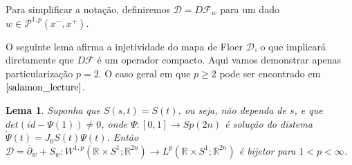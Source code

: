 \documentclass[12pt]{book}
\newtheorem{lema}[teorema]{Lema}
\newcommand{\caminhosexponenciaisconectantes}[2]{\mathcal{P}^{1,p}(#1, #2)}
\newcommand{\caminhosexponenciaisconectantespadrao}{\caminhosexponenciaisconectantes{x^{-}}{x^{+}}}
\newcommand{\circulo}{S^{1}}
\newcommand{\diferencialmapafloer}{D\mapafloer}
\newcommand{\diferencialmapafloerabrev}{\mathcal{D}}
\newcommand{\espacoLpcontradominio}[2]{L^{p}(#1;#2)}
\newcommand{\espacoLpretacirculo}{\espacoLpcontradominio{\retacartesianocirculo}{\real{2n}}}
\newcommand{\espacosobolevcontradominio}[2]{W^{1,p}(#1;#2)}
\newcommand{\espacosobolevretacirculo}{\espacosobolevcontradominio{\retacartesianocirculo}{\real{2n}}}
\newcommand{\estruturacomplexa}{J_{0}}
\newcommand{\gruposimpletico}[1]{Sp(#1)}
\newcommand{\mapafloer}{\mathcal{F}}
\newcommand{\operadorcauchyabrev}[1]{\overline{\partial}_{#1}}
\newcommand{\retacartesianocirculo}{\real{} \times \circulo}
\newcommand{\real}[1]{\mathbb{R}^{#1}}
\begin{document}
	Para simplificar a notação, definiremos $\diferencialmapafloerabrev = D\mapafloer_{w}$ para um dado $w\in \caminhosexponenciaisconectantespadrao$.
	
	O seguinte lema afirma a injetividade do mapa de Floer $\diferencialmapafloerabrev$, o que implicará diretamente que $\diferencialmapafloer$ é um operador compacto. Aqui vamos demonstrar apenas particularização $p=2$. O caso geral em que $p\geq 2$ pode ser encontrado em $\cite{salamon_lecture}$.
	\begin{lema}\label{lema_diferencial_floer_bijecao}
		Suponha que $S(s,t) = S(t)$, ou seja, não dependa de $s$, e que $det(id - \Psi(1)) \neq 0 $, onde $\Psi:[0,1] \to \gruposimpletico{2n}$ é solução do distema $\dot{\Psi}(t)=\estruturacomplexa S(t)\Psi(t)$. Então $\diferencialmapafloerabrev = \operadorcauchyabrev{w} + S_{w}: \espacosobolevretacirculo \to \espacoLpretacirculo$ é bijetor para $1 < p <\infty$.
	\end{lema}
\end{document}
